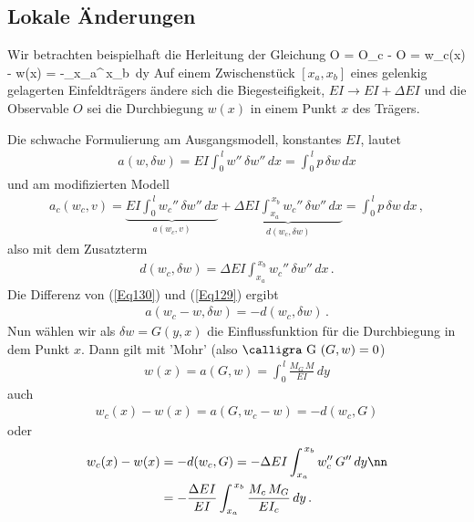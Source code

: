 \textcolor{blau2}{\subsection{Lokale \"{A}nderungen}}\label{Lokale\"{A}nderungen}
Wir betrachten beispielhaft die Herleitung der Gleichung
\bfo
\Delta O = O_c - O = w_c(x) - w(x) = -\int_{x_a}^{\,x_b} \,dy
\efo
Auf einem Zwischenst\"{u}ck $[x_a,x_b]$ eines gelenkig gelagerten Einfeldtr\"{a}gers \"{a}ndere sich die Biegesteifigkeit, $EI \to EI + \Delta EI$ und die Observable $O$ sei die Durchbiegung $w(x)$ in einem Punkt $x$ des Tr\"{a}gers.

Die schwache Formulierung am  Ausgangsmodell, konstantes $EI$, lautet
\begin{align}\label{Eq129}
 a(w, \delta w) = EI\int_0^{\,l} w''\,\delta w''\,dx = \int_0^{\,l} p\,\delta w\,dx
\end{align}
und am modifizierten Modell
\begin{align}\label{Eq130}
a_c(w_c,v) = \underbrace{EI\int_0^{\,l} w_c''\, \delta w''\,dx}_{a(w_c,v)} + \underbrace{\Delta EI\int_{x_a}^{\,x_b} w_c''\,\delta w''\,dx}_{d(w_c,\delta w)} = \int_0^{\,l} p\,\delta w\,dx\,,
\end{align}
also mit dem Zusatzterm
\begin{align}
d(w_c,\delta w) = \Delta EI\int_{x_a}^{\,x_b} w_c''\,\delta w''\,dx\,.
\end{align}
Die Differenz von (\ref{Eq130}) und (\ref{Eq129}) ergibt
\begin{align}
a(w_c - w,\delta w) = - d(w_c, \delta w)\,.
\end{align}
Nun w\"{a}hlen wir als $\delta w = G(y,x)$ die Einflussfunktion f\"{u}r die Durchbiegung in dem Punkt $x$. Dann gilt mit 'Mohr' (also $\text{\normalfont\calligra G\,\,}(G, w) = 0$)
\begin{align}
w(x) = a(G,w) = \int_0^{\,l} \frac{M_G\,M}{EI}\,dy
\end{align}
auch
\begin{align}\label{Eq131}
w_c(x) - w(x) = a(G,w_c - w) = - d(w_c, G)
\end{align}
oder
\begin{align}
w_c(x) - w(x) &= - d(w_c, G) = - \Delta EI\int_{x_a}^{\,x_b} w_c''\,G''\,dy \nn \\
&= - \frac{\Delta EI}{EI} \int_{x_a}^{\,x_b} \frac{M_c\,M_G}{EI_c}\,dy\,.
\end{align}
